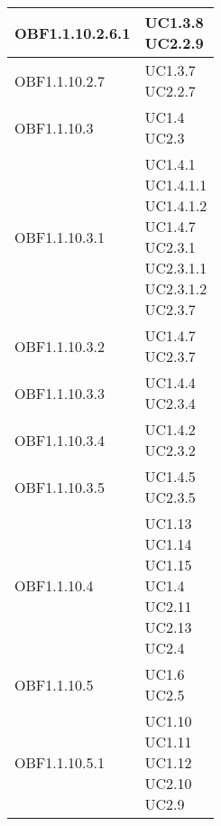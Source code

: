 \documentclass{scalatekids-article}
\begin{document}
\begin{longtable}[H]{|p{5.5cm}|p{5.5cm}|}
  \hline
  OBF1.1.10.2.6.1 & \multiLineCell[t]{UC1.3.8\\UC2.2.9\\}\\
  \hline
  OBF1.1.10.2.7 & \multiLineCell[t]{UC1.3.7\\UC2.2.7\\}\\
  \hline
  OBF1.1.10.3 & \multiLineCell[t]{UC1.4\\UC2.3\\}\\
  \hline
  OBF1.1.10.3.1 & \multiLineCell[t]{UC1.4.1\\UC1.4.1.1\\UC1.4.1.2\\UC1.4.7\\UC2.3.1\\UC2.3.1.1\\UC2.3.1.2\\UC2.3.7\\}\\
  \hline
  OBF1.1.10.3.2 & \multiLineCell[t]{UC1.4.7\\UC2.3.7\\}\\
  \hline
  OBF1.1.10.3.3 & \multiLineCell[t]{UC1.4.4\\UC2.3.4\\}\\
  \hline
  OBF1.1.10.3.4 & \multiLineCell[t]{UC1.4.2\\UC2.3.2\\}\\
  \hline
  OBF1.1.10.3.5 & \multiLineCell[t]{UC1.4.5\\UC2.3.5\\}\\
  \hline
  OBF1.1.10.4 & \multiLineCell[t]{UC1.13\\UC1.14\\UC1.15\\UC1.4\\UC2.11\\UC2.13\\UC2.4\\}\\
  \hline
  OBF1.1.10.5 & \multiLineCell[t]{UC1.6\\UC2.5\\}\\
  \hline
  OBF1.1.10.5.1 & \multiLineCell[t]{UC1.10\\UC1.11\\UC1.12\\UC2.10\\UC2.9\\}\\

\end{longtable}
\end{document}
